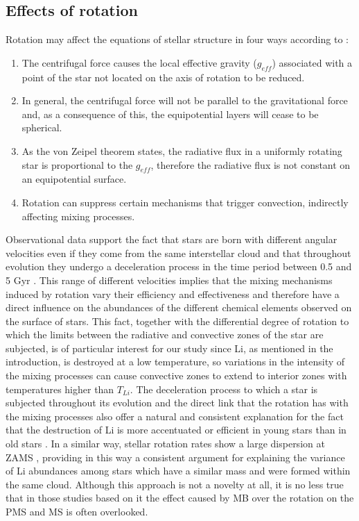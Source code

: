 \documentclass[fleqn,usenatbib]{mnras}
\begin{document}
\subsection{Effects of rotation}
Rotation may affect the equations of stellar structure in four ways according to \citet{Endal1976}:
\begin{enumerate}
    \item The centrifugal force causes the local effective gravity ($g_{eff}$) associated with a point of the star not located on the axis of rotation to be reduced.
    \item In general, the centrifugal force will not be parallel to the gravitational force and, as a consequence of this, the equipotential layers will cease to be spherical.
    \item As the von Zeipel theorem states, the radiative flux in a uniformly rotating star is proportional to the $g_{eff}$, therefore the radiative flux is not constant on an equipotential surface.
    \item Rotation can suppress certain mechanisms that trigger convection, indirectly affecting mixing processes.
\end{enumerate}

Observational data support the fact that stars are born with different angular velocities even if they come from the same interstellar cloud and that throughout evolution they undergo a deceleration process \citep{Skumanich1972} in the time period between 0.5 and 5 Gyr \citep{Somers2014a}. This range of different velocities implies that the mixing mechanisms induced by rotation vary their efficiency and effectiveness and therefore have a direct influence on the abundances of the different chemical elements observed on the surface of stars.  This fact, together with the differential degree of rotation to which the limits between the radiative and convective zones of the star are subjected, is of particular interest for our study since Li, as mentioned in the introduction, is destroyed at a low temperature, so variations in the intensity of the mixing processes can cause convective zones to extend to interior zones with temperatures higher than $T_{Li}$. The deceleration process to which a star is subjected throughout its evolution and the direct link that the rotation has with the mixing processes also offer a natural and consistent explanation for the fact that the destruction of Li is more accentuated or efficient in young stars than in old stars \citep{Sestito2005}. In a similar way, stellar rotation rates show a large dispersion at ZAMS \citep{Stauffer1984}, providing in this way a consistent argument for explaining the variance of Li abundances among stars which have a similar mass and were formed within the same cloud. Although this approach is not a novelty at all, it is no less true that in those studies based on it the effect caused by MB over the rotation on the PMS and MS is often overlooked. \par
\end{document}
